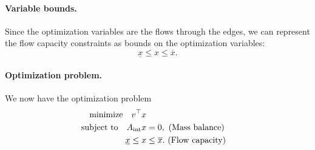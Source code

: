 \paragraph{Variable bounds.} Since the optimization variables are the flows through the edges, we can represent the flow capacity constraints as bounds on the optimization variables:
\[
\underline{x} \leq x \leq \overline{x}.
\]
\paragraph{Optimization problem.} We now have the optimization problem
\begin{subequations}
\begin{align}
\mathrm{minimize} \ \ \  v^\top x \\
\mathrm{subject\ to} \ \ \  A_{\mathrm{int}}x &= 0,\ \mathrm{(Mass\ balance)} \\
\underline{x} \leq x &\leq \overline{x}. \ \mathrm{(Flow\ capacity)}
\end{align}
\end{subequations}

